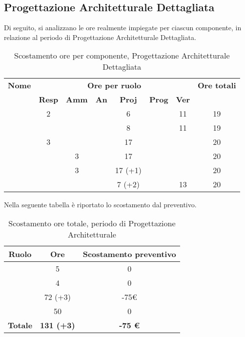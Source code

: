 \newpage
\subsection{Progettazione Architetturale Dettagliata}

Di seguito, si analizzano le ore realmente impiegate per ciascun componente, in relazione al periodo di Progettazione Architetturale Dettagliata.

\begin{table}[H]
	\begin{center}
		\begin{tabular}{|c|c|c|c|c|c|c|c|}
			\hline
			\textbf{Nome} & \multicolumn{6}{c|}{\textbf{Ore per ruolo}} & \textbf{Ore totali} \\\cline{2-7}
			& \textbf{Resp} & \textbf{Amm} & \textbf{An} & \textbf{Proj} & \textbf{Prog} & \textbf{Ver} & \\
			\hline
			\MC			&	2	&		&		&	6	&		&	11	&	19	\\
			\hline
			\AN			&		&		&		&	8	&   	&	11	& 	19	\\
			\hline
			\DAN		&	3	&		&		&	17	&		&		&	20	\\
			\hline
			\AS			&		&	3	&	 	&	17	&	 	& 		&	20	\\
			\hline
			\NS 		&		&	3	&		&	17 (+1)	&		& 		&	20	\\
			\hline
			\DS			& 		&		&		&	7 (+2)	&		&	13	&	20	\\
			\hline
		\end{tabular}
	\end{center}
	\caption{Scostamento ore per componente, Progettazione Architetturale Dettagliata}
\end{table}

Nella seguente tabella è riportato lo scostamento dal preventivo.

\begin{table}[H]
	\begin{center}
		\begin{tabular}{|c|c|c|}
			\hline
			\textbf{Ruolo}	& \textbf{Ore}	& \textbf{Scostamento preventivo} \\
			\hline
			\Res	&	5	&	0	\\
			\hline
			\Amm	&	4	&	0	\\
			\hline
			\Prog   &	72 (+3)  &	-75€	\\
			\hline
			\Ver	&	50	&	0 \\
			\hline
			\textbf{Totale} & \textbf{131 (+3)} & \textbf{-75 €}\\
			\hline
		\end{tabular}
	\end{center}
	\caption{Scostamento ore totale, periodo di Progettazione Architetturale}
\end{table}


